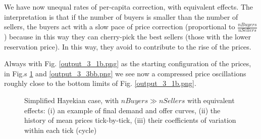 \documentclass[10pt]{report}
\begin{document}
\begin{appendices}
\begin{itemize}
\end{itemize}

We have now unequal rates of per-capita correction, with equivalent effects. The interpretation is that if the number of buyers is smaller than the number of sellers, the buyers act with a slow pace of price correction (proportional to $\frac{nBuyers}{nSellers}$) because in this way they can cherry-pick the best sellers (those with the lower reservation price). In this way, they avoid to contribute to the rise of the prices.

Always with Fig. \ref{output_3_1b.png} as the starting configuration of the prices, in Fig.s \ref{output_3_2bb.png} and \ref{output_3_3bb.png} we see now a compressed price oscillations roughly close to the bottom limits of Fig. \ref{output_3_1b.png}.

\begin{figure}[H]
\begin{center}
\caption{Simplified Hayekian case, with $nBuyers \gg nSellers$ with equivalent effects: (i) an example of final demand and offer curves, (ii) the history of mean prices tick-by-tick, (iii) their coefficients of variation within each tick (cycle)}
\label{output_3_2bb.png}
\end{center}
\end{figure}


\end{appendices}
\end{document}
